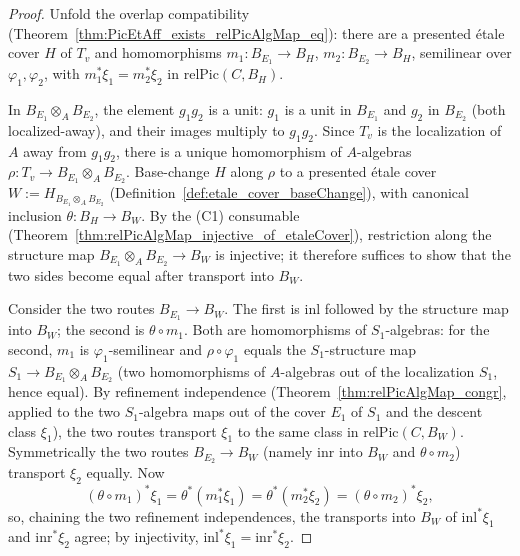 \begin{proof}
  \leanok
  Unfold the overlap compatibility (Theorem~\ref{thm:PicEtAff_exists_relPicAlgMap_eq}): there are a
  presented \'etale cover \(H\) of \(T_v\) and homomorphisms \(m_1 \colon B_{E_1} \to B_H\),
  \(m_2 \colon B_{E_2} \to B_H\), semilinear over \(\varphi_1, \varphi_2\), with \(m_1^{*}\xi_1 =
  m_2^{*}\xi_2\) in \(\mathrm{relPic}(C, B_H)\).

  In \(B_{E_1} \otimes_A B_{E_2}\), the element \(g_1 g_2\) is a unit: \(g_1\) is a unit in
  \(B_{E_1}\) and \(g_2\) in \(B_{E_2}\) (both localized-away), and their images multiply to
  \(g_1 g_2\). Since \(T_v\) is the localization of \(A\) away from \(g_1 g_2\), there is a unique
  homomorphism of \(A\)-algebras \(\rho \colon T_v \to B_{E_1} \otimes_A B_{E_2}\). Base-change \(H\)
  along \(\rho\) to a presented \'etale cover \(W := H_{B_{E_1} \otimes_A B_{E_2}}\)
  (Definition~\ref{def:etale_cover_baseChange}), with canonical inclusion \(\theta \colon B_H \to
  B_W\). By the (C1) consumable (Theorem~\ref{thm:relPicAlgMap_injective_of_etaleCover}), restriction
  along the structure map \(B_{E_1} \otimes_A B_{E_2} \to B_W\) is injective; it therefore suffices
  to show that the two sides become equal after transport into \(B_W\).

  Consider the two routes \(B_{E_1} \to B_W\). The first is \(\mathrm{inl}\) followed by the
  structure map into \(B_W\); the second is \(\theta \circ m_1\). Both are homomorphisms of
  \(S_1\)-algebras: for the second, \(m_1\) is \(\varphi_1\)-semilinear and \(\rho \circ \varphi_1\)
  equals the \(S_1\)-structure map \(S_1 \to B_{E_1} \otimes_A B_{E_2}\) (two homomorphisms of
  \(A\)-algebras out of the localization \(S_1\), hence equal). By refinement independence
  (Theorem~\ref{thm:relPicAlgMap_congr}, applied to the two \(S_1\)-algebra maps out of the cover
  \(E_1\) of \(S_1\) and the descent class \(\xi_1\)), the two routes transport \(\xi_1\) to the
  same class in \(\mathrm{relPic}(C, B_W)\). Symmetrically the two routes \(B_{E_2} \to B_W\)
  (namely \(\mathrm{inr}\) into \(B_W\) and \(\theta \circ m_2\)) transport \(\xi_2\) equally. Now
  \[
    (\theta \circ m_1)^{*}\xi_1 = \theta^{*}(m_1^{*}\xi_1) = \theta^{*}(m_2^{*}\xi_2)
      = (\theta \circ m_2)^{*}\xi_2 ,
  \]
  so, chaining the two refinement independences, the transports into \(B_W\) of
  \(\mathrm{inl}^{*}\xi_1\) and \(\mathrm{inr}^{*}\xi_2\) agree; by injectivity,
  \(\mathrm{inl}^{*}\xi_1 = \mathrm{inr}^{*}\xi_2\).
\end{proof}

